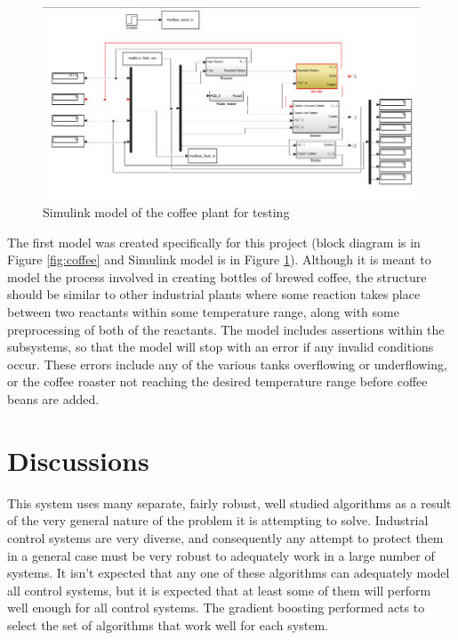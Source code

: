 \documentclass[10pt,twocolumn]{IEEEtran}
\begin{document}
\begin{figure}
  \centering
  \includegraphics[width=\textwidth]{coffee_simulink.png}
  \caption{Simulink model of the coffee plant for testing}
  \label{fig:coffee_simulink}
\end{figure}

The first model was created specifically for this project (block diagram is in Figure \ref{fig:coffee} and Simulink model is in Figure \ref{fig:coffee_simulink}).
Although it is meant to model the process involved in creating bottles of brewed coffee, the structure should be similar to other industrial plants where some reaction takes place between two reactants within some temperature range, along with some preprocessing of both of the reactants.
The model includes assertions within the subsystems, so that the model will stop with an error if any invalid conditions occur.
These errors include any of the various tanks overflowing or underflowing, or the coffee roaster not reaching the desired temperature range before coffee beans are added.


\section{Discussions}\label{sec:discussion}
This system uses many separate, fairly robust, well studied algorithms as a result of the very general nature of the problem it is attempting to solve.
Industrial control systems are very diverse, and consequently any attempt to protect them in a general case must be very robust to adequately work in a large number of systems.
It isn't expected that any one of these algorithms can adequately model all control systems, but it is expected that at least some of them will perform well enough for all control systems.
The gradient boosting performed acts to select the set of algorithms that work well for each system.
\end{document}
